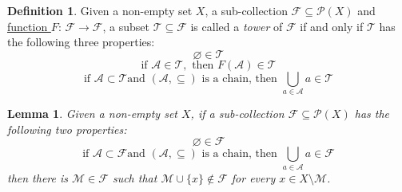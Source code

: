\documentclass[12pt]{article}
\numberwithin{equation}{section}
\theoremstyle{plain} %
\newtheorem{lemma}[equation]{Lemma}
\theoremstyle{definition}
\newtheorem{definition}[equation]{Definition}
\theoremstyle{remark}
\begin{document}
\begin{definition}
Given a non-empty set $X$, a sub-collection $\mathcal{F} \subseteq \mathcal{P}(X)$ and \hyperref[definition:B_star]{function $F$}: $\mathcal{F} \to \mathcal{F}$, a subset  $\mathcal{T} \subseteq \mathcal{F}$ is called a \textit{tower} of $\mathcal{F}$ if and only if $\mathcal{T}$ has the following three properties: \label{definition:tower}
	\begin{equation*}
	    \varnothing \in \mathcal{T} \tag{3.3.1}\label{definition:3.3.1}
	\end{equation*}
	\begin{equation*}
	   \text{if }\mathcal{A} \in \mathcal{T}, \text{ then } F(\mathcal{A}) \in \mathcal{T} \tag{3.3.2}\label{definition:3.3.2}
	\end{equation*}
	\begin{equation*}
	    \text{if }\mathcal{A} \subset \mathcal{T} \text{and } (\mathcal{A}, \subseteq) \text{ is a chain, then } \bigcup_{a \in \mathcal{A}}a \in \mathcal{T} \tag{3.3.3}\label{definition:3.3.3}
	\end{equation*}
\end{definition}

\begin{lemma}
Given a non-empty set $X$, if a sub-collection $\mathcal{F} \subseteq \mathcal{P}(X)$ has the following two properties: \label{lemma:FF}
	\begin{equation*}
	    \varnothing \in \mathcal{F} \tag{3.4.1}\label{lemma:3.4.1}
	\end{equation*}
	\begin{equation*}
	    \text{if }\mathcal{A} \subset \mathcal{F} \text{and } (\mathcal{A}, \subseteq) \text{ is a chain, then } \bigcup_{a \in \mathcal{A}}a \in \mathcal{F} \tag{3.4.2}\label{lemma:3.4.2}
	\end{equation*}
then there is $\mathcal{M} \in \mathcal{F}$ such that $\mathcal{M} \cup \{x\} \notin \mathcal{F}$  for every $x \in X \setminus \mathcal{M}$. 
\end{lemma}
\end{document}

